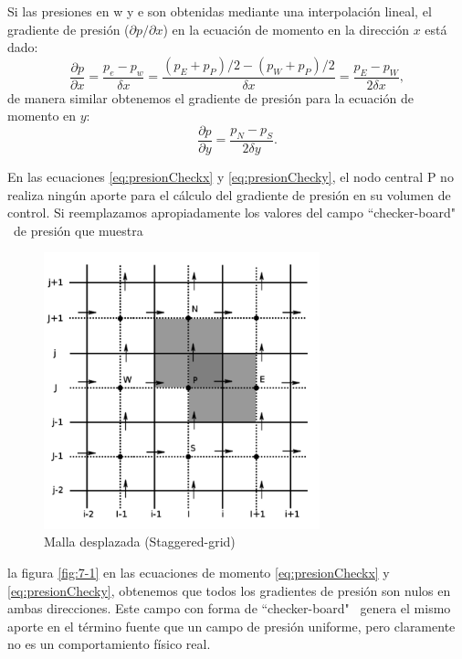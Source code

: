\documentclass[a4paper,10pt, oneside]{book}
\begin{document}
Si las presiones en w y e son obtenidas mediante una interpolación lineal, el gradiente de presión ($\partial p / \partial x$) en la ecuación de momento en la dirección $x$ está dado:
\begin{equation}
  \frac{\partial p}{\partial x} = \frac{p_e - p_w}{\delta x} = \frac{ (p_E + p_P)/2 - (p_W + p_P)/2}{\delta x} = \frac{p_E - p_W}{2 \delta x},
  \label{eq:presionCheckx}
\end{equation}
de manera similar obtenemos el gradiente de presión para la ecuación de momento en $y$:
\begin{equation}
  \frac{\partial p}{\partial y} = \frac{p_N - p_S}{2 \delta y}.
  \label{eq:presionChecky}
\end{equation}

En las ecuaciones \ref{eq:presionCheckx} y \ref{eq:presionChecky}, el nodo central P no realiza ningún aporte para el cálculo del gradiente de presión en su volumen de control. Si reemplazamos apropiadamente los valores del campo ``checker-board" \ de presión que muestra
\begin{figure}[h!]
  \centering
  \includegraphics[width=8cm]{Img/7-2}
  \caption{Malla desplazada (Staggered-grid)}
  \label{fig:7-2}
\end{figure}
la figura \ref{fig:7-1} en las ecuaciones de momento \ref{eq:presionCheckx} y \ref{eq:presionChecky}, obtenemos que todos los gradientes de presión son nulos en ambas direcciones. Este campo con forma de ``checker-board" \ genera el mismo aporte en el término fuente que un campo de presión uniforme, pero claramente no es un comportamiento físico real.
\end{document}
